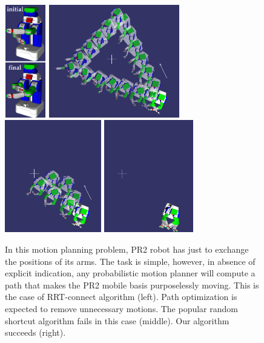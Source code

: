 \documentclass{tADR2e}
\begin{document}
\begin{figure}[H]
	\centering
	\includegraphics[height=4.9cm,width=1.8cm]{pr2_initial_final_vertical.png}
	\includegraphics[width=5.7cm]{p0_pr2_alone_merged3.png}
	\includegraphics[height=4.9cm]{p1RS_pr2_alone_merged3.png}
	\includegraphics[height=4.9cm]{p1GB_pr2_alone_merged3.png}\\
	\caption{In this motion planning problem, PR2 robot has just to 
exchange the positions of its arms. The task is simple, however, in absence of 
explicit indication, any probabilistic motion planner will compute a path that 
makes the PR2 mobile basis purposelessly moving. This is the case of RRT-connect 
algorithm (left). Path optimization is expected to remove unnecessary motions. 
The popular random shortcut algorithm fails in this case (middle). Our algorithm 
succeeds (right).}
	\label{pr2_final}
\end{figure}
\end{document}
